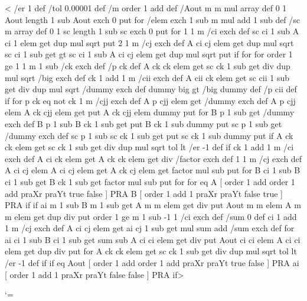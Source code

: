 <{%
  /er 1 def  %
  /tol 0.00001 def %
  /m order 1 add def %
  /Aout m m mul array def %
  0 1 Aout length 1 sub { Aout exch 0 put } for
  /elem { exch 1 sub m mul add 1 sub } def %
  /sc m array def %
  0 1 sc length 1 sub { sc exch 0 put } for
  1 1 m { /ci exch def
    sc
    ci 1 sub
    A ci 1 elem get
    dup mul sqrt
    put
    2 1 m { /cj exch def
      A ci cj elem get
      dup mul sqrt
      sc ci 1 sub get gt {%
      sc
      ci 1 sub
      A ci cj elem get
      dup mul sqrt
      put } if
    } for
  } for
  order 1 ge {%
  1 1 m 1 sub { /ck exch def
    /p ck def
    A ck ck elem get
    sc ck 1 sub get div
    dup mul sqrt
    /big exch def
    ck 1 add 1 m {/cii exch def
      A cii ck elem get
      sc cii 1 sub get div
      dup mul sqrt
      /dummy exch def
      dummy big gt { /big dummy def /p cii def } if
    } for
    p ck eq not {
    ck 1 m {/cjj exch def
      A p cjj elem get
      /dummy exch def
      A p cjj elem
      A ck cjj elem get
      put
      A ck cjj elem
      dummy
      put
    } for
    B p 1 sub get
    /dummy exch def
    B p 1 sub
    B ck 1 sub get
    put
    B ck 1 sub
    dummy
    put
    sc p 1 sub get
    /dummy exch def
    sc p 1 sub
    sc ck 1 sub get
    put
    sc ck 1 sub
    dummy
    put
    } if 
    A ck ck elem get
    sc ck 1 sub get div
    dup mul sqrt tol lt { /er -1 def } if
    ck 1 add 1 m { /ci exch def
      A ci ck elem get
      A ck ck elem get div
      /factor exch def
      1 1 m { /cj exch def  %
        A ci cj elem %
        A ci cj elem get
        A ck cj elem get
        factor
        mul sub %
        put
      } for
      B ci 1 sub %
      B ci 1 sub get
      B ck 1 sub get
      factor
      mul sub %
      put
    } for
  } for
    \Pst@Debug{} eq {
    A [ order 1 add order 1 add praXr praYt \psk@MaScale\space true false ] PRA
    B [ order 1 add 1 praXr praYt \psk@MaScale\space false true ] PRA
  } if
  } if
  ai m 1 sub
  B m 1 sub get
  A m m elem get
  div put
  Aout m m elem
  A m m elem get dup div
  put
  order 1 ge {%
  m 1 sub -1 1 { /ci exch def
    /sum 0 def
    ci 1 add 1 m { /cj exch def
      A ci cj elem get
      ai cj 1 sub get
      mul sum add
      /sum exch def
    } for
    ai ci 1 sub
    B ci 1 sub get
    sum sub
    A ci ci elem get
    div put
    Aout ci ci elem
    A ci ci elem get dup div
    put
  } for
  A ck ck elem get
  sc ck 1 sub get div
  dup mul sqrt tol lt { /er -1 def } if
  } if
  \Pst@Debug{} eq {
  Aout [ order 1 add order 1 add praXr praYt \psk@MaScale\space true false ] PRA
  ai [ order 1 add 1 praXr praYt \psk@MaScale\space false false ] PRA } if}>

%
\catcode`\@=\PstAtCode\relax
%
\endinput

